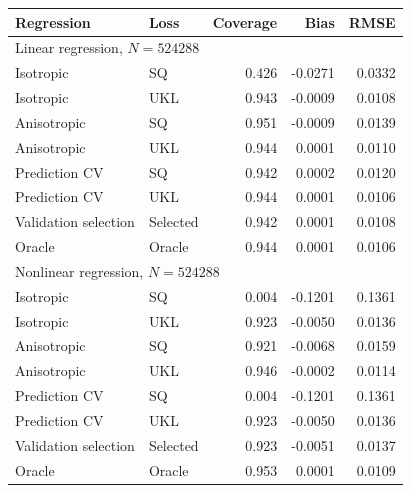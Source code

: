 \begin{tabular}{llrrr}
\hline
Regression & Loss & Coverage & Bias & RMSE \\
\hline
\multicolumn{5}{l}{Linear regression, $N=524288$} \\
Isotropic & SQ & 0.426 & -0.0271 & 0.0332 \\
Isotropic & UKL & 0.943 & -0.0009 & 0.0108 \\
Anisotropic & SQ & 0.951 & -0.0009 & 0.0139 \\
Anisotropic & UKL & 0.944 & 0.0001 & 0.0110 \\
Prediction CV & SQ & 0.942 & 0.0002 & 0.0120 \\
Prediction CV & UKL & 0.944 & 0.0001 & 0.0106 \\
Validation selection & Selected & 0.942 & 0.0001 & 0.0108 \\
Oracle & Oracle & 0.944 & 0.0001 & 0.0106 \\
\hline
\multicolumn{5}{l}{Nonlinear regression, $N=524288$} \\
Isotropic & SQ & 0.004 & -0.1201 & 0.1361 \\
Isotropic & UKL & 0.923 & -0.0050 & 0.0136 \\
Anisotropic & SQ & 0.921 & -0.0068 & 0.0159 \\
Anisotropic & UKL & 0.946 & -0.0002 & 0.0114 \\
Prediction CV & SQ & 0.004 & -0.1201 & 0.1361 \\
Prediction CV & UKL & 0.923 & -0.0050 & 0.0136 \\
Validation selection & Selected & 0.923 & -0.0051 & 0.0137 \\
Oracle & Oracle & 0.953 & 0.0001 & 0.0109 \\
\hline
\end{tabular}
